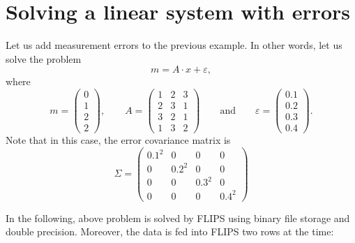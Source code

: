 \documentclass[a4paper,twoside]{refrep}
\begin{document}
\newpage






\section{Solving a linear system with errors}

Let us add measurement errors to the previous example. In other words, let us solve the problem
\[
m = A\cdot x + \varepsilon,
\]
where
\[
m =
\begin{pmatrix}
0 \\
1\\
2\\
2
\end{pmatrix},\qquad
A=
\begin{pmatrix}
1 & 2 & 3\\
2 & 3 & 1\\
3 & 2 & 1\\
1 & 3 & 2
\end{pmatrix}\qquad\text{and}\qquad
\varepsilon=
\left(\begin{array}{c}0.1 \\0.2 \\0.3 \\0.4\end{array}\right).
\]
Note that in this case, the error covariance matrix is
\[
\Sigma=
\left(\begin{array}{cccc}0.1^2 & 0 & 0 & 0 \\0 & 0.2^2 & 0 & 0 \\0 & 0 & 0.3^2 & 0 \\0 & 0 & 0 & 0.4^2\end{array}\right)
\]

In the following, above problem is solved by FLIPS using binary file storage and double precision. Moreover, the data is fed into FLIPS two rows at the time:
\end{document}
